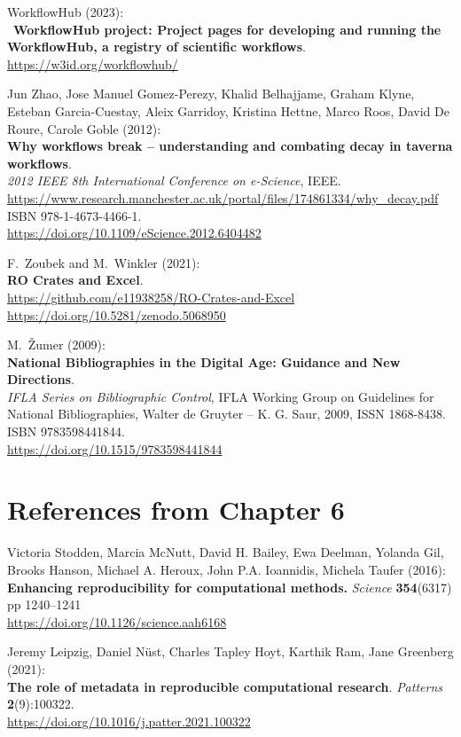 \begin{thebibliography}{9}
\bibitem[WorkflowHub 2023]
WorkflowHub (2023):\\
~\textbf{WorkflowHub project: Project pages for developing and
running the WorkflowHub, a registry of scientific workflows}.\\
\url{https://w3id.org/workflowhub/}

Jun Zhao, Jose Manuel Gomez-Perezy, Khalid Belhajjame, Graham
Klyne, Esteban Garcia-Cuestay, Aleix Garridoy, Kristina Hettne, Marco
Roos, David De Roure, Carole Goble (2012):\\
\textbf{Why workflows break -- understanding and combating decay in
taverna workflows}.\\
\emph{2012 IEEE 8th International Conference on e-Science}, IEEE.
\url{https://www.research.manchester.ac.uk/portal/files/174861334/why_decay.pdf}
ISBN 978-1-4673-4466-1.\\
\url{https://doi.org/10.1109/eScience.2012.6404482}

F.~Zoubek and M.~Winkler (2021):\\
\textbf{RO Crates and Excel}.\\
\url{https://github.com/e11938258/RO-Crates-and-Excel}
\url{https://doi.org/10.5281/zenodo.5068950}

M.~Žumer (2009):\\
\textbf{National Bibliographies in the Digital Age: Guidance and New
Directions}.\\
\emph{IFLA Series on Bibliographic Control}, IFLA Working Group on
Guidelines for National Bibliographies, Walter de Gruyter -- K. G. Saur,
2009, ISSN 1868-8438. ISBN 9783598441844.\\
\url{https://doi.org/10.1515/9783598441844}


\section{References from Chapter 6}

Victoria Stodden, Marcia McNutt, David H. Bailey, Ewa Deelman,
Yolanda Gil, Brooks Hanson, Michael A. Heroux, John P.A. Ioannidis,
Michela Taufer (2016):\\
\textbf{Enhancing reproducibility for computational methods.}
\emph{Science} \textbf{354}(6317) pp 1240--1241\\
\url{https://doi.org/10.1126/science.aah6168}

Jeremy Leipzig, Daniel Nüst, Charles Tapley Hoyt, Karthik Ram,
Jane Greenberg (2021):\\
\textbf{The role of metadata in reproducible computational research}.
\emph{Patterns} \textbf{2}(9):100322.\\
\url{https://doi.org/10.1016/j.patter.2021.100322}


\end{thebibliography}
